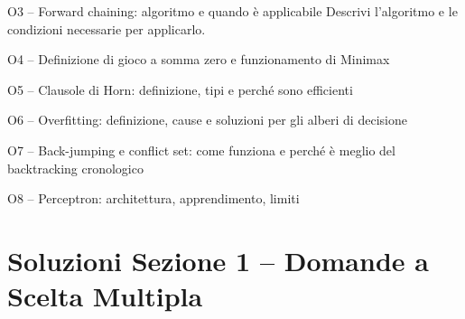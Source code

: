 \documentclass[12pt,a4paper]{article}
\begin{document}
\begin{domanda}{O3 -- Forward chaining: algoritmo e quando è applicabile}
Descrivi l'algoritmo e le condizioni necessarie per applicarlo.

\vspace{3cm}
\end{domanda}

\begin{domanda}{O4 -- Definizione di gioco a somma zero e funzionamento di Minimax}
\vspace{4cm}
\end{domanda}

\begin{domanda}{O5 -- Clausole di Horn: definizione{,} tipi e perché sono efficienti}
\vspace{4cm}
\end{domanda}

\begin{domanda}{O6 -- Overfitting: definizione{,} cause e soluzioni per gli alberi di decisione}
\vspace{4cm}
\end{domanda}

\begin{domanda}{O7 -- Back-jumping e conflict set: come funziona e perché è meglio del backtracking cronologico}
\vspace{4cm}
\end{domanda}

\begin{domanda}{O8 -- Perceptron: architettura{,} apprendimento{,} limiti}
\vspace{4cm}
\end{domanda}


\newpage
\begin{tcolorbox}[colback=red!8, colframe=red!60!black, fonttitle=\Large\bfseries,
  title=SOLUZIONI -- Apri questa sezione solo dopo aver completato tutti gli esercizi]
\end{tcolorbox}

\section*{Soluzioni Sezione 1 -- Domande a Scelta Multipla}
\end{document}
